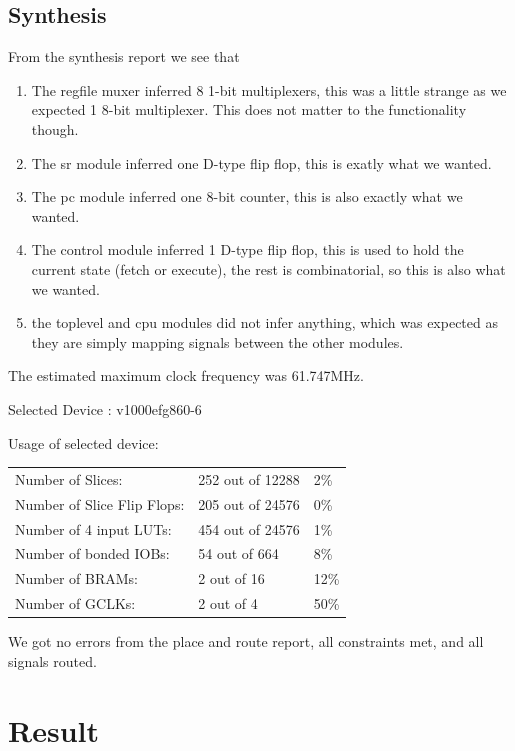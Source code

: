 \documentclass[11pt]{report}
\begin{document}
\subsection*{Synthesis}

From the synthesis report we see that
\begin{enumerate}
\item The regfile muxer inferred 8 1-bit multiplexers, this was a
  little strange as we expected 1 8-bit multiplexer.  This does not
  matter to the functionality though.
\item The sr module inferred one D-type flip flop, this is exatly what
  we wanted.
\item The pc module inferred one 8-bit counter, this is also exactly
  what we wanted.
\item The control module inferred 1 D-type flip flop, this is used to
  hold the current state (fetch or execute), the rest is
  combinatorial, so this is also what we wanted.
\item the toplevel and cpu modules did not infer anything, which was
  expected as they are simply mapping signals between the other
  modules.
\end{enumerate}

The estimated maximum clock frequency was 61.747MHz.

Selected Device : v1000efg860-6 

Usage of selected device:
\begin{table}[h]
  \centering
  \begin{tabular}{|l|l|l|} 
    \hline
    Number of Slices:&252 out of 12288&2\% \\ 
    Number of Slice Flip Flops:&205 out of 24576&0\% \\
    Number of 4 input LUTs:&454 out of 24576&1\% \\
    Number of bonded IOBs:&54 out of 664&8\% \\ 
    Number of BRAMs:&2 out of 16&12\% \\  
    Number of GCLKs:&2 out of 4&50\% \\
    \hline
  \end{tabular}
\end{table}


We got no errors from the place and route report, all constraints met,
and all signals routed.

\section*{Result}
\end{document}
